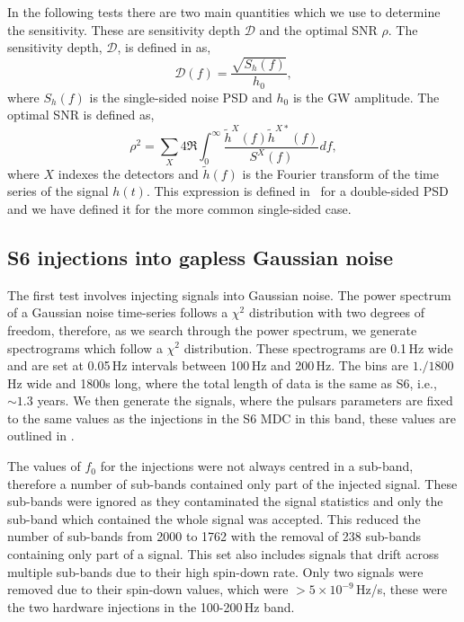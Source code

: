 In the following tests there are two main quantities which we use to determine
the sensitivity. These are sensitivity depth $\mathcal{D}$ and the optimal
\gls{SNR} $\rho$.  The sensitivity depth, $\mathcal{D}$, is defined in
\citep{behnke2015PostprocessingMethods} as,
%
\begin{equation}
\label{soap:results:sigmoid}
\mathcal{D}(f) = \frac{\sqrt{S_h(f)}}{h_0},
\end{equation}
%
where $S_h(f)$ is the single-sided noise \gls{PSD} and $h_0$ is the \gls{GW} amplitude.  The optimal \gls{SNR} is defined as,
%
\begin{equation}
\rho^2 = \sum_X 4
\Re\int^{\infty}_{0}\frac{\tilde{h}^X(f)\tilde{h}^{X*}(f)}{S^X(f)}df,
\end{equation}
%
 where $X$ indexes the
detectors and $\tilde{h}(f)$ is the Fourier transform of the time
series of the signal $h(t)$. This expression is defined in~\citep{prix2007SearchContinuous} for
a double-sided \gls{PSD} and we have defined it for the more common single-sided
case.

\subsection{\label{soap:results:gaplessgauss}S6 injections into gapless Gaussian noise}
%
%
The first test involves injecting signals into Gaussian noise. The power spectrum of a Gaussian noise time-series follows a $\chi^2$ distribution with two degrees of freedom, therefore, as we search through the power spectrum, we generate spectrograms which follow a $\chi^2$ distribution. 
These spectrograms are 0.1\,Hz wide and are set at 0.05\,Hz intervals between 100\,Hz and 200\,Hz. The bins are $1./1800$\,Hz wide and 1800s long, where the total length of data is the same as S6, i.e., $\sim 1.3$ years.
We then generate the signals, where the pulsars parameters are
fixed to the same values as the injections in the S6 \gls{MDC} in this band, 
these values are outlined in \citep{walsh2016ComparisonMethods}.

%
%
The values of $f_0$ for the injections were not always centred in a
sub-band, therefore a number of sub-bands contained only part of the injected
signal. These sub-bands were ignored as they contaminated the signal statistics
and only the sub-band which contained the whole signal was accepted.  This
reduced the number of sub-bands from 2000 to 1762 with the removal of 238
sub-bands containing only part of a signal.
This set also includes signals that
drift across multiple sub-bands due to their high spin-down
rate. Only two signals were removed due to their spin-down values, which were $> 5 \times 10^{-9}$\,Hz/s, these were the two hardware injections in the 100-200\,Hz band.

